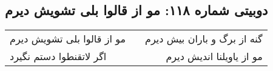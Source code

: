 \begin{center}
\section*{دوبیتی شماره ۱۱۸: مو از قالوا بلی تشویش دیرم}
\label{sec:118}
\begin{longtable}{l p{0.5cm} r}
مو از قالوا بلی تشویش دیرم
&&
گنه از برگ و باران بیش دیرم
\\
اگر لاتقنطوا دستم نگیرد
&&
مو از یاویلنا اندیش دیرم
\\
\end{longtable}
\end{center}
